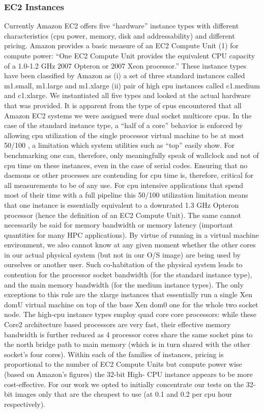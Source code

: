 \documentclass[conference, compsoc]{IEEEtran}
\begin{document}
\subsubsection{EC2 Instances}
\vspace{.2cm}	
Currently Amazon EC2 offers five “hardware” instance types with different characteristics (cpu power, memory, disk and addressability) and different pricing. Amazon provides a basic measure of an EC2 Compute Unit (1) for compute power: “One EC2 Compute Unit provides the equivalent CPU capacity of a 1.0-1.2 GHz 2007 Opteron or 2007 Xeon processor.” These instance types have been classified by Amazon as (i) a set of three standard instances called m1.small, m1.large and m1.xlarge (ii) pair of high cpu instances called c1.medium and c1.xlarge. We instantiated all five types and looked at the actual hardware that was provided. It is apparent from the type of cpus encountered that all Amazon EC2 systems we were assigned were dual socket multicore cpus. In the case of the standard instance type, a “half of a core” behavior is enforced by allowing cpu utilization of the single processor virtual machine to be at most 50/100 , a limitation which system utilities such as “top” easily show. For benchmarking one can, therefore, only meaningfully speak of wallclock and not of cpu time on these instances, even in the case of serial codes. Ensuring that no daemons or other processes are contending for cpu time is, therefore, critical for all measurements to be of any use. For cpu intensive applications that spend most of their time with a full pipeline this 50/100 utilization limitation means that one instance is essentially equivalent to a downrated 1.3 GHz Opteron processor (hence the definition of an EC2 Compute Unit). The same cannot necessarily be said for memory bandwidth or memory latency (important quantities for many HPC applications). By virtue of running in a virtual machine environment, we also cannot know at any given moment whether the other cores in our actual physical system (but not in our O/S image) are being used by ourselves or another user. Such co-habitation of the physical system leads to contention for the processor socket bandwidth (for the standard instance type), and the main memory bandwidth (for the medium instance types). The only exceptions to this rule are the xlarge instances that essentially run a single Xen domU virtual machine on top of the base Xen dom0 one for the whole two socket node. The high-cpu instance types employ quad core core processors: while these Core2 architecture based processors are very fast, their effective memory bandwidth is further reduced as 4 processor cores share the same socket pins to the north bridge path to main memory (which is in turn shared with the other socket’s four cores). Within each of the families of instances, pricing is proportional to the number of EC2 Compute Units but compute power wise (based on Amazon’s figures) the 32-bit High- CPU instance appears to be more cost-effective. For our work we opted to initially concentrate our tests on the 32-bit images only that are the cheapest to use (at 0.1 and 0.2 per cpu hour respectively).
\end{document}
